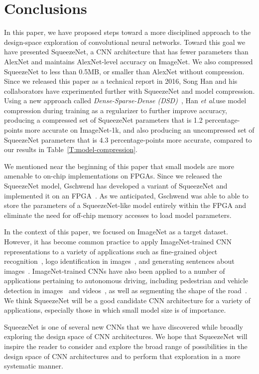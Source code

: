 \documentclass{article} \usepackage{iclr2017_conference,times}
\newcommand{\etal}{\textit{et al}.}
\renewcommand{\cite}{\citep}
\def\vsp{\vspace{-0.15in}}
\begin{document}
\section{Conclusions}
\label{sec:conclusions}
\vsp

In this paper, we have proposed steps toward a more disciplined approach to the design-space exploration of convolutional neural networks. 
Toward this goal we have presented SqueezeNet, a CNN architecture that has  fewer parameters than AlexNet and maintains AlexNet-level accuracy on ImageNet.
We also compressed SqueezeNet to less than 0.5MB, or  smaller than AlexNet without compression. 
Since we released this paper as a technical report in 2016, Song Han and his collaborators have experimented further with SqueezeNet and model compression.
Using a new approach called {\em Dense-Sparse-Dense (DSD)}~\cite{DSD}, Han \etal use model compression during training as a regularizer to further improve accuracy, producing a compressed set of SqueezeNet parameters that is 1.2 percentage-points more accurate on ImageNet-1k, and also producing an uncompressed set of SqueezeNet parameters that is 4.3 percentage-points more accurate, compared to our results in Table~\ref{T:model-compression}.

We mentioned near the beginning of this paper that small models are more amenable to on-chip implementations on FPGAs.
Since we released the SqueezeNet model, Gschwend has developed a variant of SqueezeNet and implemented it on an FPGA~\cite{ZynqNet}.
As we anticipated, Gschwend was able to able to store the parameters of a SqueezeNet-like model entirely within the FPGA and eliminate the need for off-chip memory accesses to load model parameters.

In the context of this paper, we focused on ImageNet as a target dataset.
However, it has become common practice to apply ImageNet-trained CNN representations to a variety of applications such as fine-grained object recognition~\cite{DPD, decaf}, logo identification in images~\cite{DeepLogo}, and generating sentences about images~\cite{forrestMicrosoft}.
ImageNet-trained CNNs have also been applied to a number of applications pertaining to autonomous driving, including pedestrian and vehicle detection in images~\cite{DenseNet,DPMareCNN,Ashraf2016} and videos~\cite{Urtasun2015}, as well as segmenting the shape of the road~\cite{SegNet}. 
We think SqueezeNet will be a good candidate CNN architecture for a variety of applications, especially those in which small model size is of importance.

SqueezeNet is one of several new CNNs that we have discovered while broadly exploring the design space of CNN architectures.
We hope that SqueezeNet will inspire the reader to consider and explore the broad range of possibilities in the design space of CNN architectures and to perform that exploration in a more systematic manner.









\end{document}
